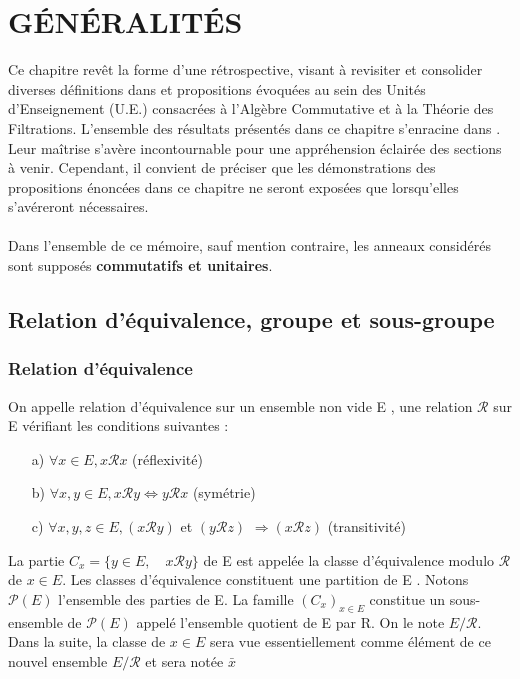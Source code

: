 \chapter{GÉNÉRALITÉS}
Ce chapitre revêt la forme d'une rétrospective, visant à revisiter et consolider diverses définitions dans \cite{5} et propositions évoquées au sein des Unités d'Enseignement (U.E.) consacrées à l'Algèbre Commutative et à la Théorie des Filtrations. L'ensemble des résultats présentés dans ce chapitre s'enracine dans \cite{6}. Leur maîtrise s'avère incontournable pour une appréhension éclairée des sections à venir. Cependant, il convient de préciser que les démonstrations des propositions énoncées dans ce chapitre ne seront exposées que lorsqu'elles s'avéreront nécessaires. \\\\ Dans l'ensemble de ce mémoire, sauf mention contraire, les anneaux considérés sont supposés \textbf{commutatifs et unitaires}.
\section{Relation d'équivalence, groupe et sous-groupe}
\subsection{Relation d'équivalence}
\begin{madefinition}
	On appelle relation d’équivalence sur un ensemble non vide E , une relation
	$\mathcal{R}$ sur E vérifiant les conditions suivantes :
	\begin{enumerate}
		\item[a) ] $\forall x \in E, x\mathcal{R}x$ (réflexivité)
		\item[b) ] $\forall x,y \in E, x\mathcal{R}y \Longleftrightarrow y\mathcal{R}x $ (symétrie)
		\item[c) ] $\forall x,y,z \in E, (x\mathcal{R}y)$ et $(y\mathcal{R}z)$ $\Longrightarrow (x\mathcal{R}z)$  (transitivité)
	\end{enumerate}
	La partie $C_x = \{y \in E,\quad x\mathcal{R}y\}  $ de E est appelée la classe d’équivalence modulo $\mathcal{R}$ de $x \in E$. Les	classes d’équivalence constituent une partition de E . Notons $\mathcal{P}(E)$ l’ensemble des parties de E. La famille $(C_x)_{x \in E}$ constitue un sous-ensemble de $\mathcal{P}(E)$ appelé l’ensemble quotient de E par R. On le note $E/\mathcal{R}$. 
	Dans la suite, la classe de $x \in E$ sera vue essentiellement comme élément de ce nouvel ensemble $E/\mathcal{R}$ et sera notée $\bar{x}$
\end{madefinition}
